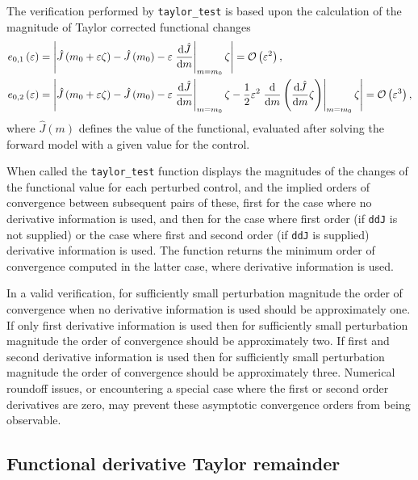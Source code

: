 \documentclass[11pt]{article}
\begin{document}
The verification performed by \texttt{taylor\_test} is based upon the
calculation of the magnitude of Taylor corrected functional changes
\citep{farrell2013}
\begin{align*}
  e_{0,1} \left( \varepsilon \right) & = \left|
    \hat{J} \left( m_0 + \varepsilon \zeta \right)
    - \hat{J} \left( m_0 \right)
    - \varepsilon \left. \frac{\mathrm{d} \hat{J}}{\mathrm{d} m} \right|_{m = m_0} \zeta
    \right| = {\cal O} \left( \varepsilon^2 \right), \\
  e_{0,2} \left( \varepsilon \right) & = \left|
    \hat{J} \left( m_0 + \varepsilon \zeta \right) - \hat{J} \left( m_0 \right)
    - \varepsilon \left. \frac{\mathrm{d} \hat{J}}{\mathrm{d} m} \right|_{m = m_0} \zeta
    - \frac{1}{2} \varepsilon^2 \left. \frac{\mathrm{d}}{\mathrm{d} m} \left( \frac{\mathrm{d} \hat{J}}{\mathrm{d} m} \zeta \right) \right|_{m = m_0} \zeta
    \right| = {\cal O} \left( \varepsilon^3 \right),
\end{align*}
where $\hat{J} \left( m \right)$ defines the value of the functional, evaluated
after solving the forward model with a given value for the control.

When called the \texttt{taylor\_test} function displays the magnitudes of the
changes of the functional value for each perturbed control, and the implied
orders of convergence between subsequent pairs of these, first for the case
where no derivative information is used, and then for the case where first
order (if \texttt{ddJ} is not supplied) or the case where first and second
order (if \texttt{ddJ} is supplied) derivative information is used. The
function returns the minimum order of convergence computed in the latter case,
where derivative information is used.

In a valid verification, for sufficiently small perturbation magnitude the
order of convergence when no derivative information is used should be
approximately one. If only first derivative information is used then for
sufficiently small perturbation magnitude the order of convergence should be
approximately two. If first and second derivative information is used then for
sufficiently small perturbation magnitude the order of convergence should be
approximately three. Numerical roundoff issues, or encountering a special case
where the first or second order derivatives are zero, may prevent these
asymptotic convergence orders from being observable.

\subsection{Functional derivative Taylor remainder}
\end{document}
